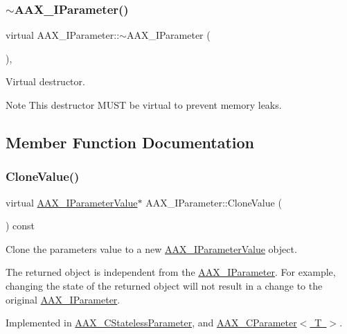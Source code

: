 \subsubsection{\texorpdfstring{$\sim$AAX\_IParameter()}{~AAX\_IParameter()}}
{\footnotesize\ttfamily virtual A\+A\+X\+\_\+\+I\+Parameter\+::$\sim$\+A\+A\+X\+\_\+\+I\+Parameter (\begin{DoxyParamCaption}{ }\end{DoxyParamCaption})\hspace{0.3cm}{\ttfamily [inline]}, {\ttfamily [virtual]}}



Virtual destructor. 

\begin{DoxyNote}{Note}
This destructor M\+U\+ST be virtual to prevent memory leaks. 
\end{DoxyNote}


\subsection{Member Function Documentation}
\mbox{\label{a01857_a85ce34797e0a9bb3cf05458757144cb9}} 
\subsubsection{\texorpdfstring{CloneValue()}{CloneValue()}}
{\footnotesize\ttfamily virtual \mbox{\hyperlink{a01853}{A\+A\+X\+\_\+\+I\+Parameter\+Value}}$\ast$ A\+A\+X\+\_\+\+I\+Parameter\+::\+Clone\+Value (\begin{DoxyParamCaption}{ }\end{DoxyParamCaption}) const\hspace{0.3cm}{\ttfamily [pure virtual]}}



Clone the parameter\textquotesingle{}s value to a new \mbox{\hyperlink{a01853}{A\+A\+X\+\_\+\+I\+Parameter\+Value}} object. 

The returned object is independent from the \mbox{\hyperlink{a01857}{A\+A\+X\+\_\+\+I\+Parameter}}. For example, changing the state of the returned object will not result in a change to the original \mbox{\hyperlink{a01857}{A\+A\+X\+\_\+\+I\+Parameter}}. 

Implemented in \mbox{\hyperlink{a01541_a32390258de83c4007fdde4d51a597989}{A\+A\+X\+\_\+\+C\+Stateless\+Parameter}}, and \mbox{\hyperlink{a01537_a7677ba568ddf62f7393ea76c154dc397}{A\+A\+X\+\_\+\+C\+Parameter$<$ T $>$}}.



